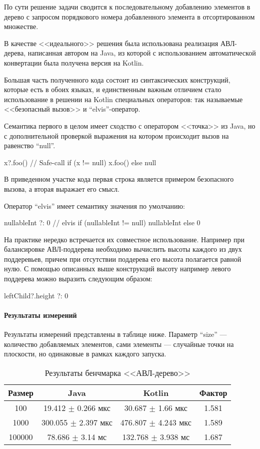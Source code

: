 По сути решение задачи сводится к последовательному добавлению элементов в дерево с запросом
порядкового номера добавленного элемента в отсортированном множестве.

В качестве <<идеального>> решения была использована реализация АВЛ-дерева, написанная автором
на Java, из которой с использованием автоматической конвертации была получена версия на Kotlin.

Большая часть полученного кода состоит из синтаксических конструкций, которые есть в обоих языках,
и единственным важным отличием стало использование в решении на Kotlin специальных операторов:
так называемые <<безопасный вызов>> и ``elvis''-оператор.

Семантика первого в целом имеет сходство с оператором <<точка>> из Java, но с дополнительной
проверкой выражения на котором происходит вызов на равенство ``null''.
\begin{pyglist}[language=kotlin]
x?.foo() // Safe-call
if (x != null) x.foo() else null
\end{pyglist}
В приведенном участке кода первая строка является примером безопасного вызова, а вторая
выражает его смысл.

Оператор ``elvis'' имеет семантику значения по умолчанию:
\begin{pyglist}[language=kotlin]
nullableInt ?: 0 // elvis
if (nullableInt != null) nullableInt else 0
\end{pyglist}

На практике нередко встречается их совместное использование.
Например при балансировке АВЛ-поддерева необходимо вычислить высоты каждого из двух поддеревьев,
причем при отсутствии поддерева его высота полагается равной нулю.
С помощью описанных выше конструкций высоту например левого поддерева можно выразить следующим
образом:
\begin{pyglist}[language=kotlin]
leftChild?.height ?: 0
\end{pyglist}

\paragraph{Результаты измерений}
Результаты измерений представлены в таблице ниже.
Параметр ``size'' --- количество добавляемых элементов, сами элементы --- случайные точки
на плоскости, но одинаковые в рамках каждого запуска.

\begin{table}[h]
\begin{center}
\begin{tabular}{|c|c|c|c|} \hline
Размер & Java & Kotlin & Фактор \\ \hline
100 & 19.412 $\pm$ 0.266 мкс & 30.687 $\pm$ 1.66 мкс & 1.581\\ \hline
1000 & 300.055 $\pm$ 2.397 мкс & 476.807 $\pm$ 4.243 мкс & 1.589\\ \hline
100000 & 78.686 $\pm$ 3.14 мс & 132.768 $\pm$ 3.938 мс & 1.687\\ \hline
\end{tabular}
\caption{Результаты бенчмарка <<АВЛ-дерево>>}
\end{center}
\end{table}

